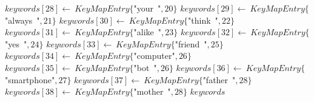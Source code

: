 \documentclass[a4paper,10pt]{article}
\begin{document}
\begin{algorithm}
\begin{algorithmic}[5]
  \STATE \(keywords[28]\gets\ KeyMapEntry\{\)"{}your\ "{}\(,20\}\)
  \STATE \(keywords[29]\gets\ KeyMapEntry\{\)"{}always\ "{}\(,21\}\)
  \STATE \(keywords[30]\gets\ KeyMapEntry\{\)"{}think\ "{}\(,22\}\)
  \STATE \(keywords[31]\gets\ KeyMapEntry\{\)"{}alike\ "{}\(,23\}\)
  \STATE \(keywords[32]\gets\ KeyMapEntry\{\)"{}yes\ "{}\(,24\}\)
  \STATE \(keywords[33]\gets\ KeyMapEntry\{\)"{}friend\ "{}\(,25\}\)
  \STATE \(keywords[34]\gets\ KeyMapEntry\{\)"{}computer"{}\(,26\}\)
  \STATE \(keywords[35]\gets\ KeyMapEntry\{\)"{}bot\ "{}\(,26\}\)
  \STATE \(keywords[36]\gets\ KeyMapEntry\{\)"{}smartphone"{}\(,27\}\)
  \STATE \(keywords[37]\gets\ KeyMapEntry\{\)"{}father\ "{}\(,28\}\)
  \STATE \(keywords[38]\gets\ KeyMapEntry\{\)"{}mother\ "{}\(,28\}\)
  \RETURN\(keywords\)

\end{algorithmic}
\end{algorithm}


\STATE {}
\end{document}

